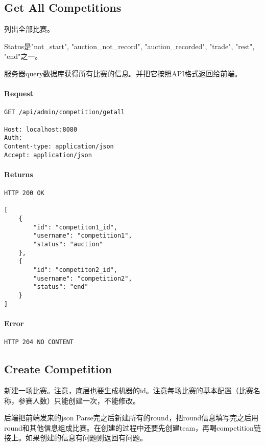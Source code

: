 \documentclass{article}
\begin{document}
\subsection{Get All Competitions}

列出全部比赛。

Status是"not\_start", "auction\_not\_record", "auction\_recorded", "trade", "rest", "end"之一。

服务器query数据库获得所有比赛的信息。并把它按照API格式返回给前端。

\paragraph*{Request}
\begin{lstlisting}
GET /api/admin/competition/getall

Host: localhost:8080
Auth:
Content-type: application/json
Accept: application/json
\end{lstlisting}

\paragraph*{Returns}
\begin{lstlisting}
HTTP 200 OK

[
    {
        "id": "competiton1_id",
        "username": "competition1",
        "status": "auction"
    },
    {
        "id": "competiton2_id",
        "username": "competition2",
        "status": "end"
    }
]
\end{lstlisting}

\paragraph*{Error}
\begin{lstlisting}
HTTP 204 NO CONTENT
\end{lstlisting}

\subsection{Create Competition}
新建一场比赛。注意，底层也要生成机器的id。注意每场比赛的基本配置（比赛名称，参赛人数）只能创建一次，不能修改。

后端把前端发来的json Parse完之后新建所有的round，把round信息填写完之后用round和其他信息组成比赛。在创建的过程中还要先创建team，再喝competition链接上。如果创建的信息有问题则返回有问题。
\end{document}

